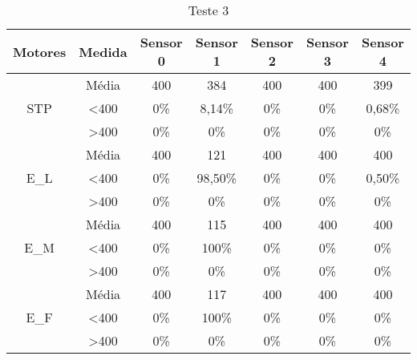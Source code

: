 \begin{table}[]
\centering
\caption{Teste 3}
\label{teste_3}
\begin{tabular}{|c|c|ccccc|}
\hline
\textbf{Motores}                & \textbf{Medida}  & \textbf{Sensor 0} & \textbf{Sensor 1} & \textbf{Sensor 2} & \textbf{Sensor 3} & \textbf{Sensor 4} \\ \hline
\multirow{3}{*}{STP}            & Média            & 400               & 384               & 400               & 400               & 399               \\
                                & \textless 400    & 0\%            & 8,14\%            & 0\%            & 0\%            & 0,68\%            \\
                                & \textgreater 400 & 0\%            & 0\%            & 0\%            & 0\%            & 0\%            \\ \hline
\multirow{3}{*}{E\_L}           & Média            & 400               & 121               & 400               & 400               & 400               \\
                                & \textless 400    & 0\%            & 98,50\%           & 0\%            & 0\%            & 0,50\%            \\
                                & \textgreater 400 & 0\%            & 0\%            & 0\%            & 0\%            & 0\%            \\ \hline
\multirow{3}{*}{E\_M}           & Média            & 400               & 115               & 400               & 400               & 400               \\
                                & \textless 400    & 0\%            & 100\%          & 0\%            & 0\%            & 0\%            \\
                                & \textgreater 400 & 0\%            & 0\%            & 0\%            & 0\%            & 0\%            \\ \hline
\multirow{3}{*}{E\_F}           & Média            & 400               & 117               & 400               & 400               & 400               \\
                                & \textless 400    & 0\%            & 100\%          & 0\%            & 0\%            & 0\%            \\
                                & \textgreater 400 & 0\%            & 0\%            & 0\%            & 0\%            & 0\%            \\ \hline

\end{tabular}
\end{table}
